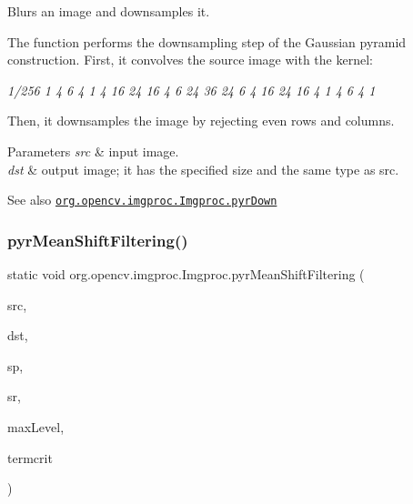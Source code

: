 Blurs an image and downsamples it.

The function performs the downsampling step of the Gaussian pyramid construction. First, it convolves the source image with the kernel\+:

{\itshape 1/256 1 4 6 4 1 4 16 24 16 4 6 24 36 24 6 4 16 24 16 4 1 4 6 4 1 }

Then, it downsamples the image by rejecting even rows and columns.


\begin{DoxyParams}{Parameters}
{\em src} & input image. \\
\hline
{\em dst} & output image; it has the specified size and the same type as {\ttfamily src}.\\
\hline
\end{DoxyParams}
\begin{DoxySeeAlso}{See also}
\href{http://docs.opencv.org/modules/imgproc/doc/filtering.html#pyrdown}{\tt org.\+opencv.\+imgproc.\+Imgproc.\+pyr\+Down} 
\end{DoxySeeAlso}
\mbox{\label{classorg_1_1opencv_1_1imgproc_1_1_imgproc_a1e4e4c176ebc30a3f5ab6f242c30db4e}} 
\subsubsection{\texorpdfstring{pyr\+Mean\+Shift\+Filtering()}{pyrMeanShiftFiltering()}\hspace{0.1cm}{\footnotesize\ttfamily [1/2]}}
{\footnotesize\ttfamily static void org.\+opencv.\+imgproc.\+Imgproc.\+pyr\+Mean\+Shift\+Filtering (\begin{DoxyParamCaption}\item[{\mbox{\hyperlink{classorg_1_1opencv_1_1core_1_1_mat}{Mat}}}]{src,  }\item[{\mbox{\hyperlink{classorg_1_1opencv_1_1core_1_1_mat}{Mat}}}]{dst,  }\item[{double}]{sp,  }\item[{double}]{sr,  }\item[{int}]{max\+Level,  }\item[{\mbox{\hyperlink{classorg_1_1opencv_1_1core_1_1_term_criteria}{Term\+Criteria}}}]{termcrit }\end{DoxyParamCaption})\hspace{0.3cm}{\ttfamily [static]}}

